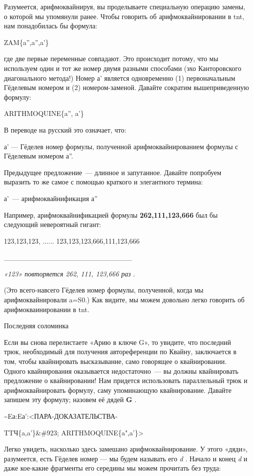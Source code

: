 \documentclass[../main.tex]{subfiles}
\begin{document}
Разумеется, арифмоквайнируя, вы проделываете специальную операцию замены, о которой мы упомянули ранее. Чтобы говорить об арифмоквайнировании в \acs{tnt}, нам понадобилась бы формула:

ZAM\{a'',a'',a'\}

где две первые переменные совпадают. Это происходит потому, что мы используем один и тот же номер двумя разными способами (эхо Канторовского диагонального метода!) Номер а' является одновременно (1) первоначальным Гёделевым номером и (2) номером-заменой. Давайте сократим вышеприведенную формулу:

ARITHMOQUINE\{a'', a'\}

В переводе на русский это означает, что:

а' --- Гёделев номер формулы, полученной арифмоквайнированием формулы с Гёделевым номером а''.

Предыдущее предложение~--- длинное и запутанное. Давайте попробуем выразить то же самое с помощью краткого и элегантного термина:

а'~--- арифмоквайнификация а''

Например, арифмоквайнификацией формулы \textbf{262,111,123,666} был бы следующий невероятный гигант:

123,123,123, ...... 123,123,123,666,111,123,666

\textbar\_\_\_\_\_\_\_\_\_\_\_\_\_\_\_\_\_\_\_\_\_\_\_\_\_\textbar{}

\emph{«123» повторяется 262, 111, 123,666 раз} .

(Это всего-навсего Гёделев номер формулы, полученной, когда мы арифмоквайнировали a=S0.) Как видите, мы можем довольно легко говорить об арифмокваинировании в \acs{tnt}.

Последняя соломинка

Если вы снова перелистаете «Арию в ключе G», то увидите, что последний трюк, необходимый для получения автореференции по Квайну, заключается в том, чтобы квайнировать высказывание, само говорящее о квайнировании. Одного квайнирования оказывается недостаточно~--- вы должны квайнировать предложение о квайнировании! Нам придется использовать параллельный трюк и арифмоквайнировать формулу, саму упоминающую квайнирование. Давайте запишем эту формулу; назовем её дядей \textbf{G} .

\textasciitilde Eа:Eа':\textless ПАРА-ДОКАЗАТЕЛЬСТВА-

TTЧ\{a,a'\}\&\#923; ARITHMOQUINE\{a",a'\}\textgreater{}

Легко увидеть, насколько здесь замешано арифмоквайнирование. У этого «дяди», разумеется, есть Гёделев номер --- мы будем называть его \emph{d} . Начало и конец \emph{d} и даже кое-какие фрагменты его середины мы можем прочитать без труда:
\end{document}
